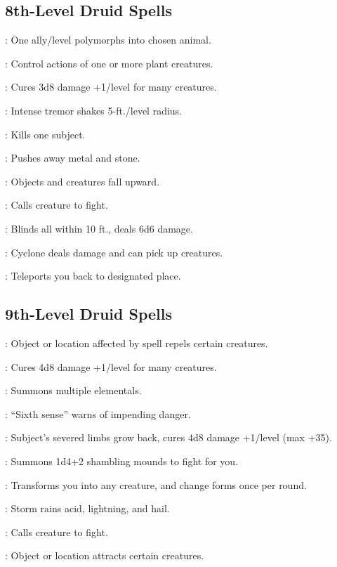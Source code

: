 \begin{multicols}{2}
\subsection{8th-Level Druid Spells}
\begin{description*}
\item[\linkspell{Animal Shapes}:] One ally/level polymorphs into chosen animal.
\item[\linkspell{Control Plants}:] Control actions of one or more plant creatures.
\item[\linkspell{Cure Serious Wounds, Mass}:] Cures 3d8 damage +1/level for many creatures.
\item[\linkspell{Earthquake}:] Intense tremor shakes 5-ft./level radius.
\item[\linkspell{Finger of Death}:] Kills one subject.
\item[\linkspell{Repel Metal or Stone}:] Pushes away metal and stone.
\item[\linkspell{Reverse Gravity}:] Objects and creatures fall upward.
\item[\linkspell{Summon Nature’s Ally VIII}:] Calls creature to fight.
\item[\linkspell{Sunburst}:] Blinds all within 10 ft., deals 6d6 damage.
\item[\linkspell{Whirlwind}:] Cyclone deals damage and can pick up creatures.
\item[\linkspell{Word of Recall}:] Teleports you back to designated place.
\end{description*}

\subsection{9th-Level Druid Spells}
\begin{description*}
\item[\linkspell{Antipathy}:] Object or location affected by spell repels certain creatures.
\item[\linkspell{Cure Critical Wounds, Mass}:] Cures 4d8 damage +1/level for many creatures.
\item[\linkspell{Elemental Swarm}:] Summons multiple elementals.
\item[\linkspell{Foresight}:] “Sixth sense” warns of impending danger.
\item[\linkspell{Regenerate}:] Subject’s severed limbs grow back, cures 4d8 damage +1/level (max +35).
\item[\linkspell{Shambler}:] Summons 1d4+2 shambling mounds to fight for you.
\item[\linkspell{Shapechange}:] Transforms you into any creature, and change forms once per round.
\item[\linkspell{Storm of Vengeance}:] Storm rains acid, lightning, and hail.
\item[\linkspell{Summon Nature’s Ally IX}:] Calls creature to fight.
\item[\linkspell{Sympathy}:] Object or location attracts certain creatures.
\end{description*}

\end{multicols}